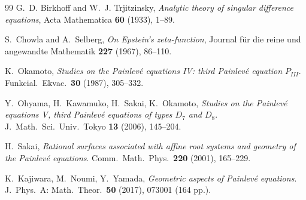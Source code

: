 \documentclass[11pt,a4paper]{article}
\theoremstyle{definition}
\theoremstyle{remark}
\begin{document}
\begin{thebibliography}{99}
G.~D. Birkhoff and W.~J. Trjitzinsky,
\emph{Analytic theory of singular difference equations},
Acta Mathematica \textbf{60} (1933), 1--89.

S.~Chowla and A.~Selberg,
\emph{On Epstein's zeta-function},
Journal f\"ur die reine und angewandte Mathematik \textbf{227} (1967), 86--110.

K.~Okamoto, \emph{Studies on the Painlev\'e equations IV: third
Painlev\'e equation $P_{III}$}.
Funkcial.\ Ekvac.\ \textbf{30} (1987), 305--332.

Y.~Ohyama, H.~Kawamuko, H.~Sakai, K.~Okamoto,
\emph{Studies on the Painlev\'e equations V, third Painlev\'e
equations of types $D_{7}$ and $D_{8}$}.
J.~Math.\ Sci.\ Univ.\ Tokyo \textbf{13} (2006), 145--204.

H.~Sakai, \emph{Rational surfaces associated with affine root
systems and geometry of the Painlev\'e equations}.
Comm.\ Math.\ Phys.\ \textbf{220} (2001), 165--229.

K.~Kajiwara, M.~Noumi, Y.~Yamada,
\emph{Geometric aspects of Painlev\'e equations}.
J.\ Phys.\ A: Math.\ Theor.\ \textbf{50} (2017), 073001 (164 pp.).

\end{thebibliography}
\end{document}
